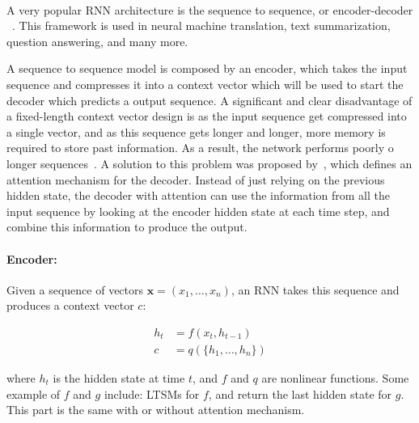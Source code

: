 \paragraph{}
A very popular RNN architecture is the sequence to sequence, or encoder-decoder ~\citep{cho-etal-2014-learning,sutskever2014sequence}. This framework is used in neural machine translation, text summarization, question answering, and many more. 

A sequence to sequence model is composed by an encoder, which takes the input sequence and compresses it into a context vector which will be used to start the decoder which predicts a output sequence.  A significant and clear disadvantage of a fixed-length context vector design is as the input sequence get compressed into a single vector, and as this sequence gets longer and longer, more memory is required to store past information. As a result, the network performs poorly o longer sequences~\citep{cho-etal-2014-properties}. A solution to this problem was proposed by~\cite{bahdanau2014neural}, which defines an attention mechanism for the decoder. Instead of just relying on the previous hidden state, the decoder with attention can use the information from all the input sequence by looking at the encoder hidden state at each time step, and combine this information to produce the output.

\paragraph{Encoder:} Given a sequence of vectors $\textbf{x} = (x_1, \dots, x_n)$, an RNN takes this sequence and produces a context vector $c$:

\begin{equation}
    \begin{split}
        h_t & = f(x_t, h_{t-1})\\
        c & = q(\{h_1, \dots, h_n\}) 
    \end{split}
\end{equation}

where $h_t$ is the hidden state at time $t$, and $f$ and $q$ are nonlinear functions. Some example of $f$ and $g$ include: LTSMs for $f$, and return the last hidden state for $g$. This part is the same with or without attention mechanism.


